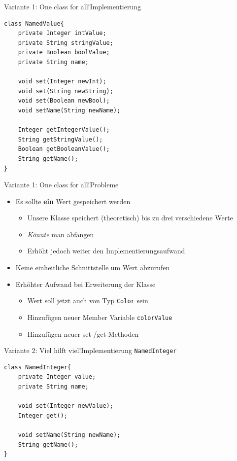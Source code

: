 \begin{frame}[fragile]{Variante 1: One class for all!}{Implementierung}
\lstset{style=java}
\begin{lstlisting}
class NamedValue{
    private Integer intValue;
    private String stringValue;
    private Boolean boolValue;
    private String name;

    void set(Integer newInt);
    void set(String newString);
    void set(Boolean newBool);
    void setName(String newName);

    Integer getIntegerValue();
    String getStringValue();
    Boolean getBooleanValue();
    String getName();
}
\end{lstlisting}
\end{frame}

\begin{frame}{Variante 1: One class for all!}{Probleme}
    \begin{itemize}
        \item Es sollte \textbf{ein} Wert gespeichert werden
            \begin{itemize}
                \item Unsere Klasse speichert (theoretisch) bis zu drei verschiedene Werte
                \item \textit{Könnte} man abfangen
                \item Erhöht jedoch weiter den Implementierungsaufwand
            \end{itemize}
            \item Keine einheitliche Schnittstelle um Wert abzurufen
            \item Erhöhter Aufwand bei Erweiterung der Klasse
            \begin{itemize}
                \item Wert soll jetzt auch von Typ \texttt{Color} sein
                \item Hinzufügen neuer Member Variable \texttt{colorValue}
                \item Hinzufügen neuer set-/get-Methoden
            \end{itemize}
    \end{itemize}
\end{frame}

\begin{frame}[fragile]{Variante 2: Viel hilft viel!}{Implementierung \texttt{NamedInteger}}
\lstset{style=java}
\begin{lstlisting}
class NamedInteger{
    private Integer value;
    private String name;
    
    void set(Integer newValue);
    Integer get();
    
    void setName(String newName);
    String getName();
}
\end{lstlisting}
\end{frame}

